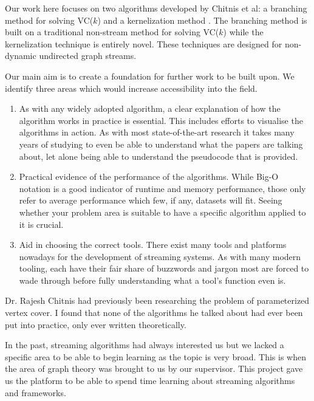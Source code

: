 Our work here focuses on two algorithms developed by Chitnis et al: a branching
method for solving VC(\(k\)) \cite{chitnis2019towards} and a kernelization
method \cite{chitnis2015parameterized}. The branching method is built on a
traditional non-stream method for solving VC(\(k\)) while the kernelization
technique is entirely novel. These techniques are designed for non-dynamic
undirected graph streams.

Our main aim is to create a foundation for further work to be built upon. We
identify three areas which would increase accessibility into the field.

\begin{enumerate}
    \item
          As with any widely adopted algorithm, a clear explanation of how the
          algorithm works in practice is essential. This includes efforts to
          visualise the algorithms in action. As with most state-of-the-art
          research it takes many years of studying to even be able to
          understand what the papers are talking about, let alone being able to
          understand the pseudocode that is provided.
    \item
          Practical evidence of the performance of the algorithms. While Big-O
          notation is a good indicator of runtime and memory performance, those
          only refer to average performance which few, if any, datasets will
          fit. Seeing whether your problem area is suitable to have a specific
          algorithm applied to it is crucial.
    \item
          Aid in choosing the correct tools. There exist many tools and
          platforms nowadays for the development of streaming systems. As with
          many modern tooling, each have their fair share of buzzwords and
          jargon most are forced to wade through before fully understanding
          what a tool's function even is.
\end{enumerate}

Dr. Rajesh Chitnis had previously been researching the problem of parameterized
vertex cover. I found that none of the algorithms he talked about had ever been
put into practice, only ever written theoretically.

In the past, streaming algorithms had always interested us but we lacked a
specific area to be able to begin learning as the topic is very broad. This is
when the area of graph theory was brought to us by our supervisor. This project
gave us the platform to be able to spend time learning about streaming
algorithms and frameworks.